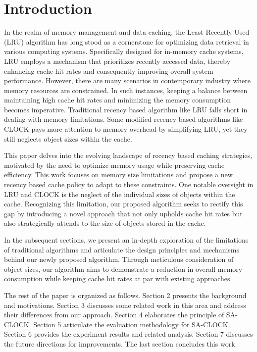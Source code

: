 \documentclass[conference]{IEEEtran}
\begin{document}
\section{Introduction}
In the realm of memory management and data caching, the Least Recently Used (LRU) algorithm has long stood as a cornerstone for optimizing data retrieval in various computing systems. Specifically designed for in-memory cache systems, LRU employs a mechanism that prioritizes recently accessed data, thereby enhancing cache hit rates and consequently improving overall system performance. However, there are many scenarios in contemporary industry where memory resources are constrained. In such instances, keeping a balance between maintaining high cache hit rates and minimizing the memory consumption becomes imperative. Traditional recency based algorithm like LRU falls short in dealing with memory limitations. Some modified recency based algorithms like CLOCK pays more attention to memory overhead by simplifying LRU, yet they still neglects object sizes within the cache.

This paper delves into the evolving landscape of recency based caching strategies, motivated by the need to optimize memory usage while preserving cache efficiency. This work focuses on memory size limitations and propose a new recency based cache policy to adapt to these constraints. One notable oversight in LRU and CLOCK is the neglect of the individual sizes of objects within the cache. Recognizing this limitation, our proposed algorithm seeks to rectify this gap by introducing a novel approach that not only upholds cache hit rates but also strategically attends to the size of objects stored in the cache.

In the subsequent sections, we present an in-depth exploration of the limitations of traditional algorithms and articulate the design principles and mechanisms behind our newly proposed algorithm. Through meticulous consideration of object sizes, our algorithm aims to demonstrate a reduction in overall memory consumption while keeping cache hit rates at par with existing approaches. 

The rest of the paper is organized as follows. Section 2 presents the background and motivations. Section 3 discusses some related work in this area and address their differences from our approach. Section 4 elaborates the principle of SA-CLOCK. Section 5 articulate the evaluation methodology for SA-CLOCK. Section 6 provides the experiment results and related analysis. Section 7 discusses the future directions for improvements. The last section concludes this work.
\end{document}
